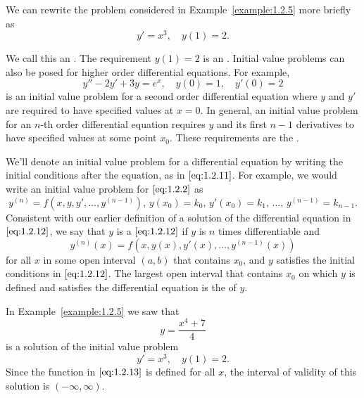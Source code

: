 \documentclass{ximera}
\begin{document}
 We can rewrite the problem considered in Example~\ref{example:1.2.5}
more briefly as
$$
y'=x^3,\quad y(1)=2.
$$
 
 We call this an .
The requirement $y(1)=2$ is an .
 Initial value problems can also be
posed for higher order differential equations.  For example,
\begin{equation} \label{eq:1.2.11}
y'' - 2y'+3y=e^x, \quad y(0)=1, \quad y'(0)=2
\end{equation}
is  an initial value problem for a second order differential
equation where $y$ and $y'$ are required to have specified values at
 $x=0$. In general, an initial value
problem for an $n$-th order differential equation requires $y$ and its
first $n-1$ derivatives to have specified values at some point $x_0$.
These requirements are the .
 
We'll denote an initial value problem for a differential equation by
writing the initial conditions after the equation, as in
$\eqref{eq:1.2.11}$. For example, we would write an initial value problem
for $\eqref{eq:1.2.2}$ as
\begin{equation} \label{eq:1.2.12}
y^{(n)}=f(x,y,y', \dots,y^{(n-1)}),\, y(x_0)=k_0,\,
y'(x_0)=k_1,\, \dots,\, y^{(n-1)}=k_{n-1}.
\end{equation}
Consistent with our earlier definition of a solution of the
differential equation in $\eqref{eq:1.2.12}$, we say that $y$ is a  $\eqref{eq:1.2.12}$  if $y$ is $n$ times
differentiable and
$$
y^{(n)}(x)=f(x,y(x),y'(x), \dots,y^{(n-1)}(x))
$$
for all $x$ in some open interval $(a,b)$  that contains $x_0$,
and  $y$ satisfies the initial conditions in $\eqref{eq:1.2.12}$. The
largest open interval that contains $x_0$ on which $y$ is defined and
satisfies the differential equation is  the  of $y$.
 
\begin{example}\label{example:1.2.6}
In Example~\ref{example:1.2.5} we saw that
\begin{equation} \label{eq:1.2.13}
y=\frac{x^4+7}{4}
\end{equation}
is a solution of the initial value problem
$$
y'=x^3,\quad y(1)=2.
$$
Since the function in $\eqref{eq:1.2.13}$ is defined for all $x$, the
interval of validity of this solution is $(-\infty,\infty)$.
\end{example}
 
\end{document}
